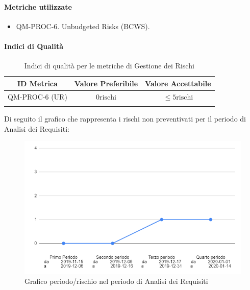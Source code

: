 		\paragraph{Metriche utilizzate}

			\begin{itemize}
				\item QM-PROC-6. Unbudgeted Risks (BCWS).
			\end{itemize}

		\paragraph{Indici di Qualità}

			\begin{center}
				\begin{longtable}{|c|c|c|}
				\hline
				\rowcolor{lighter-grayer}
				\textbf{ID Metrica} & \textbf{Valore Preferibile} & \textbf{Valore Accettabile}\\
				\hline
				\endfirsthead
				\hline
				QM-PROC-6 (UR) & \(0 \text{rischi}\) & \(\le 5 \text{rischi}\) \\
				\hline
				\caption{Indici di qualità per le metriche di Gestione dei Rischi}
				\end{longtable}
			\end{center}
			
			Di seguito il grafico che rappresenta i rischi non preventivati per il periodo di Analisi dei Requisiti:
			
			\begin{figure}[H]
				\centering
				\includegraphics[width=0.8\linewidth]{./res/images/rischi.png}
				\caption{Grafico periodo/rischio nel periodo di Analisi dei Requisiti}
				\label{fig:Grafico rischi periodo di Analisi dei Requisiti}
			\end{figure}

